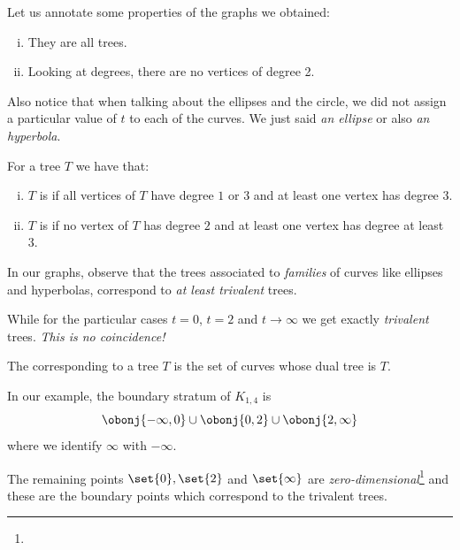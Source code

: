 \documentclass[12pt]{memoir}
\begin{document}
\begin{Rmk}
Let us annotate some properties of the graphs we obtained:
\begin{enumerate}[i)]
    \itemsep-0.4em
\item They are all trees.
\item Looking at degrees, there are no vertices of degree 2.
\end{enumerate}
Also notice that when talking about the ellipses and the circle, we did not assign a particular value of $t$ to each of the curves. We just said \emph{an ellipse} or also \emph{an hyperbola}.
\end{Rmk}

\begin{Def}
For a tree $T$ we have that:
\begin{enumerate}[i)]
    \itemsep=-0.4em
    \item $T$ is  if all vertices of $T$ have degree $1$ or $3$ and at least one vertex has degree $3$.
    \item $T$ is  if no vertex of $T$ has degree $2$ and at least one vertex has degree at least $3$.
\end{enumerate}
\end{Def}

\begin{Rmk}
In our graphs, observe that the trees associated to \emph{families} of curves like ellipses and hyperbolas, correspond to \emph{at least trivalent} trees.\par 
While for the particular cases $t=0$, $t=2$ and $t\to\infty$ we get exactly \emph{trivalent} trees. \emph{This is no coincidence!}
\end{Rmk}

\begin{Def}
    The  corresponding to a tree $T$ is the set of curves whose dual tree is $T$. 
\end{Def}

\begin{Ex}
In our example, the boundary stratum of $K_{1,4}$ is $$\obonj{-\infty,0}\cup\obonj{0,2}\cup\obonj{2,\infty}$$
where we identify $\infty$ with $-\infty$.\par 
The remaining points $\set{0},\set{2}$ and $\set{\infty}$ are \emph{zero-dimensional}\footnote{} and these are the boundary points which correspond to the trivalent trees.
\end{Ex}
\end{document}

